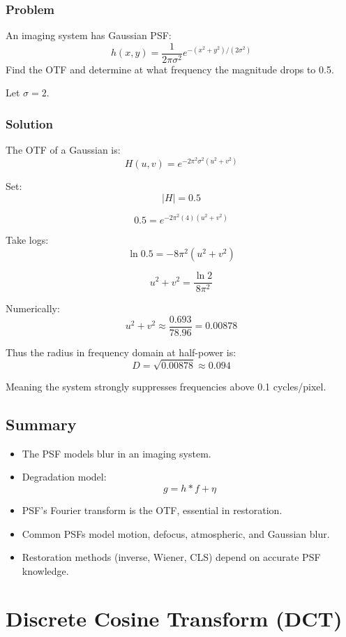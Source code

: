 \documentclass{AnantDocumentation}
\begin{document}
\subsubsection*{Problem}

An imaging system has Gaussian PSF:
\[
h(x,y)=\frac{1}{2\pi\sigma^2}e^{-(x^2+y^2)/(2\sigma^2)}
\]
Find the OTF and determine at what frequency the magnitude drops to 0.5.

Let \( \sigma = 2 \).

\subsubsection*{Solution}

The OTF of a Gaussian is:
\[
H(u,v) = e^{-2\pi^2\sigma^2 (u^2+v^2)}
\]

Set:
\[
|H| = 0.5
\]

\[
0.5 = e^{-2\pi^2(4)(u^2+v^2)}
\]

Take logs:
\[
\ln 0.5 = -8\pi^2 (u^2+v^2)
\]

\[
u^2+v^2 = \frac{\ln 2}{8\pi^2}
\]

Numerically:
\[
u^2+v^2 \approx \frac{0.693}{78.96} = 0.00878
\]

Thus the radius in frequency domain at half-power is:
\[
D = \sqrt{0.00878} \approx 0.094
\]

Meaning the system strongly suppresses frequencies above 0.1 cycles/pixel.

\subsection{Summary}

\begin{itemize}
\item The PSF models blur in an imaging system.
\item Degradation model:
\[
g = h * f + \eta
\]
\item PSF’s Fourier transform is the OTF, essential in restoration.
\item Common PSFs model motion, defocus, atmospheric, and Gaussian blur.
\item Restoration methods (inverse, Wiener, CLS) depend on accurate PSF knowledge.
\end{itemize}

\section{Discrete Cosine Transform (DCT)}
\end{document}
